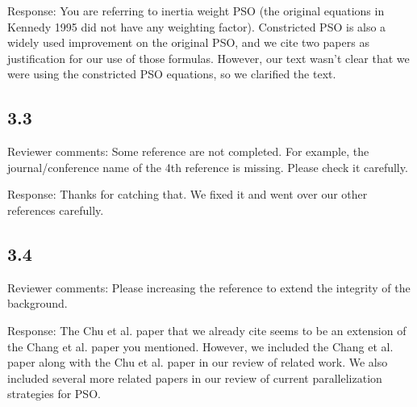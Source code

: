 \documentclass[onecolumn, 12pt]{article}
\begin{document}
Response: You are referring to inertia weight PSO (the original equations in
Kennedy 1995 did not have any weighting factor).  Constricted PSO is also a
widely used improvement on the original PSO, and we cite two papers as
justification for our use of those formulas.  However, our text wasn't clear
that we were using the constricted PSO equations, so we clarified the text.

\subsection*{3.3}

Reviewer comments: Some reference are not completed. For example, the
journal/conference name of the 4th reference is missing. Please check it
carefully.

Response: Thanks for catching that.  We fixed it and went over our other
references carefully.

\subsection*{3.4}

Reviewer comments: Please increasing the reference to extend the integrity of
the background.

Response: The Chu et al. paper that we already cite seems to be an extension of
the Chang et al. paper you mentioned.  However, we included the Chang et al.
paper along with the Chu et al. paper in our review of related work.  We also
included several more related papers in our review of current parallelization
strategies for PSO.
\end{document}
